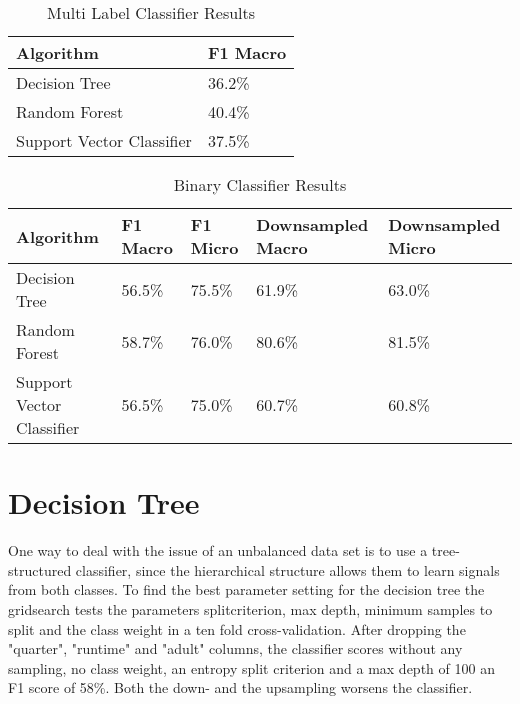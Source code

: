\begin{center}
\begin{table}
	\begin{tabular}{ | p{3.5cm} | p{1.5cm} |}
    \hline
    Algorithm & F1 Macro \\ \hline
    Decision Tree & 36.2\% \\ \hline
    Random Forest & 40.4\% \\ \hline
    Support Vector Classifier & 37.5\% \\
    \hline
    \end{tabular}
    \caption{Multi Label Classifier Results} 
    \label{tab:multi_classifier}
\end{table}
\end{center}

\begin{center}
\begin{table}
	\begin{tabular}{ | p{3.5cm} | p{1.5cm} | p{1.5cm} | p{2cm} | p{2cm} |}
    \hline
    Algorithm & F1 Macro & F1 Micro & Downsampled Macro  & Downsampled Micro\\ \hline
    Decision Tree & 56.5\% & 75.5\% & 61.9\% & 63.0\% \\ \hline
    Random Forest & 58.7\% & 76.0\% & 80.6\% & 81.5\% \\ \hline
    Support Vector Classifier & 56.5\% & 75.0\% & 60.7\% & 60.8\% \\
    \hline
    \end{tabular}
    \caption{Binary Classifier Results} 
    \label{tab:binary_classifier}
\end{table}
\end{center}

\section{Decision Tree}
One way to deal with the issue of an unbalanced data set is to use a tree-structured classifier, since the hierarchical structure allows them to learn signals from both classes.
To find the best parameter setting for the decision tree the gridsearch tests the parameters splitcriterion, max depth, minimum samples to split and the class weight in a ten fold cross-validation. After dropping the "quarter", "runtime" and "adult" columns, the classifier scores without any sampling, no class weight, an entropy split criterion and a max depth of 100 an F1 score of 58\%. Both the down- and the upsampling worsens the classifier.


